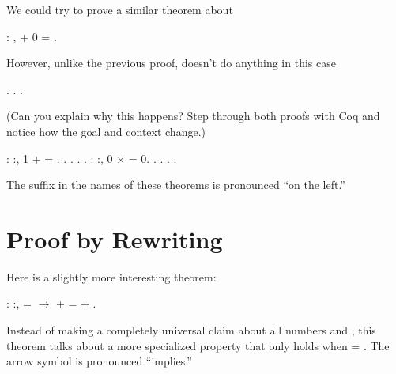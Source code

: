 \documentclass[12pt]{report}
\begin{document}
 We could try to prove a similar theorem about  \begin{coqdoccode}
\coqdocemptyline
\coqdocnoindent
{}  : \coqdockw{\ensuremath{\forall}} ,  + 0 = .\coqdoceol
\coqdocemptyline
\end{coqdoccode}
However, unlike the previous proof,  doesn't do anything in
    this case \begin{coqdoccode}
\coqdocemptyline
\coqdocnoindent
{}.\coqdoceol
\coqdocindent{1.00em}
. \coqdocnoindent
{}.\coqdoceol
\coqdocemptyline
\end{coqdoccode}
(Can you explain why this happens?  Step through both proofs with
    Coq and notice how the goal and context change.) \begin{coqdoccode}
\coqdocemptyline
\coqdocnoindent
{}  : \coqdockw{\ensuremath{\forall}} :, 1 +  =  .\coqdoceol
\coqdocnoindent
{}.\coqdoceol
\coqdocindent{1.00em}
 . . .\coqdoceol
\coqdocemptyline
\coqdocnoindent
{}  : \coqdockw{\ensuremath{\forall}} :, 0 \ensuremath{\times}  = 0.\coqdoceol
\coqdocnoindent
{}.\coqdoceol
\coqdocindent{1.00em}
 . . .\coqdoceol
\coqdocemptyline
\end{coqdoccode}
The  suffix in the names of these theorems is
    pronounced ``on the left.'' \begin{coqdoccode}
\coqdocemptyline
\end{coqdoccode}
\section{Proof by Rewriting}



 Here is a slightly more interesting theorem: \begin{coqdoccode}
\coqdocemptyline
\coqdocnoindent
{}  : \coqdockw{\ensuremath{\forall}}  :,\coqdoceol
\coqdocindent{1.00em}
 =  \ensuremath{\rightarrow} \coqdoceol
\coqdocindent{1.00em}
 +  =  + .\coqdoceol
\coqdocemptyline
\end{coqdoccode}
Instead of making a completely universal claim about all numbers
     and , this theorem talks about a more specialized property
    that only holds when  = .  The arrow symbol is pronounced
    ``implies.''
\end{document}
